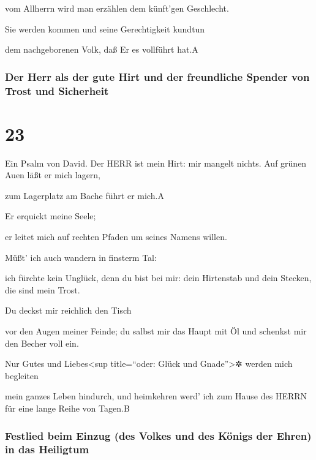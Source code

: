 vom Allherrn wird man erzählen dem künft'gen Geschlecht.

Sie werden kommen und seine Gerechtigkeit kundtun

dem nachgeborenen Volk, daß Er es vollführt hat.{A}

\hypertarget{der-herr-als-der-gute-hirt-und-der-freundliche-spender-von-trost-und-sicherheit}{%
\subsubsection{Der Herr als der gute Hirt und der freundliche Spender
von Trost und
Sicherheit}\label{der-herr-als-der-gute-hirt-und-der-freundliche-spender-von-trost-und-sicherheit}}

\hypertarget{section-22}{%
\section{23}\label{section-22}}

Ein Psalm von David. Der HERR ist mein Hirt: mir mangelt
nichts. Auf grünen Auen läßt er mich lagern,

zum Lagerplatz am Bache führt er mich.{A}

Er erquickt meine Seele;

er leitet mich auf rechten Pfaden um seines Namens willen.

Müßt' ich auch wandern in finsterm Tal:

ich fürchte kein Unglück, denn du bist bei mir: dein Hirtenstab und dein
Stecken, die sind mein Trost.

Du deckst mir reichlich den Tisch

vor den Augen meiner Feinde; du salbst mir das Haupt mit Öl und schenkst
mir den Becher voll ein.

Nur Gutes und Liebes\textless sup title=``oder: Glück und
Gnade''\textgreater✲ werden mich begleiten

mein ganzes Leben hindurch, und heimkehren werd' ich zum Hause des HERRN
für eine lange Reihe von Tagen.{B}

\hypertarget{festlied-beim-einzug-des-volkes-und-des-kuxf6nigs-der-ehren-in-das-heiligtum}{%
\subsubsection{Festlied beim Einzug (des Volkes und des Königs der
Ehren) in das
Heiligtum}\label{festlied-beim-einzug-des-volkes-und-des-kuxf6nigs-der-ehren-in-das-heiligtum}}

